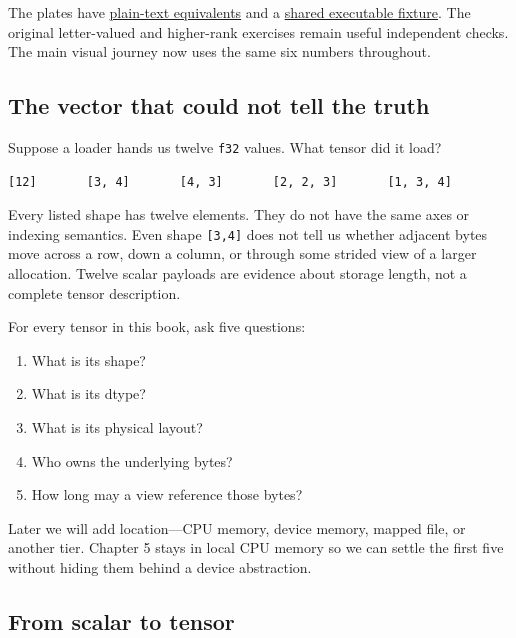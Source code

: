 \documentclass[
  10pt,
]{article}
\providecommand{\tightlist}{%
  \setlength{\itemsep}{0pt}\setlength{\parskip}{0pt}}
\begin{document}
The plates have
\href{https://github.com/hermonai/inside-the-llm-engine/blob/astra-visual-rewrite/figures/chapter05-atlas.md}{plain-text
equivalents} and a
\href{https://github.com/hermonai/inside-the-llm-engine/blob/astra-visual-rewrite/code/reference/fixtures/chapter05-visual.json}{shared
executable fixture}. The original letter-valued and higher-rank
exercises remain useful independent checks. The main visual journey now
uses the same six numbers throughout.

\subsection{The vector that could not tell the
truth}\label{the-vector-that-could-not-tell-the-truth}

Suppose a loader hands us twelve \texttt{f32} values. What tensor did it
load?

\begin{verbatim}
[12]       [3, 4]       [4, 3]       [2, 2, 3]       [1, 3, 4]
\end{verbatim}

Every listed shape has twelve elements. They do not have the same axes
or indexing semantics. Even shape \texttt{{[}3,4{]}} does not tell us
whether adjacent bytes move across a row, down a column, or through some
strided view of a larger allocation. Twelve scalar payloads are evidence
about storage length, not a complete tensor description.

For every tensor in this book, ask five questions:

\begin{enumerate}
\def\labelenumi{\arabic{enumi}.}
\tightlist
\item
  What is its shape?
\item
  What is its dtype?
\item
  What is its physical layout?
\item
  Who owns the underlying bytes?
\item
  How long may a view reference those bytes?
\end{enumerate}

Later we will add location---CPU memory, device memory, mapped file, or
another tier. Chapter 5 stays in local CPU memory so we can settle the
first five without hiding them behind a device abstraction.

\subsection{From scalar to tensor}\label{from-scalar-to-tensor}
\end{document}
